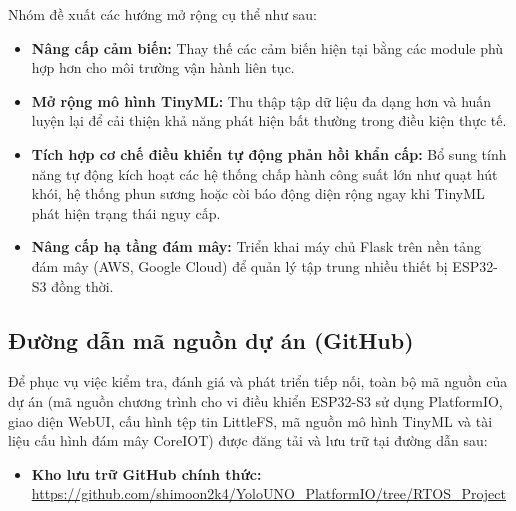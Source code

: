 Nhóm đề xuất các hướng mở rộng cụ thể như sau:
\begin{itemize}
    \item \textbf{Nâng cấp cảm biến:} Thay thế các cảm biến hiện tại bằng các module phù hợp hơn cho môi trường vận hành liên tục.
    \item \textbf{Mở rộng mô hình TinyML:} Thu thập tập dữ liệu đa dạng hơn và huấn luyện lại để cải thiện khả năng phát hiện bất thường trong điều kiện thực tế.
    \item \textbf{Tích hợp cơ chế điều khiển tự động phản hồi khẩn cấp:} Bổ sung tính năng tự động kích hoạt các hệ thống chấp hành công suất lớn như quạt hút khói, hệ thống phun sương hoặc còi báo động diện rộng ngay khi TinyML phát hiện trạng thái nguy cấp.
    \item \textbf{Nâng cấp hạ tầng đám mây:} Triển khai máy chủ Flask trên nền tảng đám mây (AWS, Google Cloud) để quản lý tập trung nhiều thiết bị ESP32-S3 đồng thời.
\end{itemize}

\subsection{Đường dẫn mã nguồn dự án (GitHub)}
Để phục vụ việc kiểm tra, đánh giá và phát triển tiếp nối, toàn bộ mã nguồn của dự án (mã nguồn chương trình cho vi điều khiển ESP32-S3 sử dụng PlatformIO, giao diện WebUI, cấu hình tệp tin LittleFS, mã nguồn mô hình TinyML và tài liệu cấu hình đám mây CoreIOT) được đăng tải và lưu trữ tại đường dẫn sau:
\begin{itemize}
    \item \textbf{Kho lưu trữ GitHub chính thức:} \url{https://github.com/shimoon2k4/YoloUNO_PlatformIO/tree/RTOS_Project}
\end{itemize}